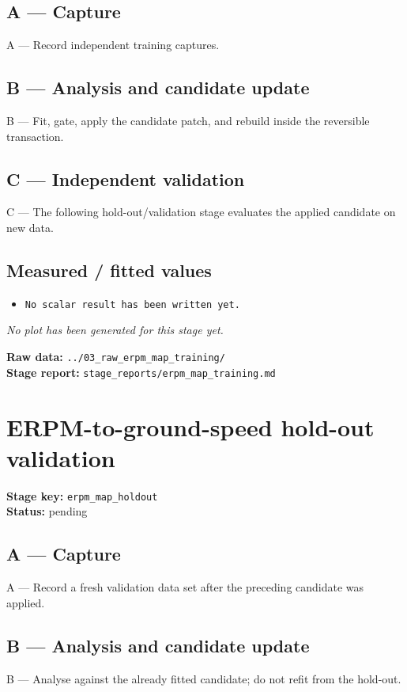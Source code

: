 \documentclass[11pt,a4paper]{article}
\begin{document}
\subsection*{A --- Capture}
A — Record independent training captures.

\subsection*{B --- Analysis and candidate update}
B — Fit, gate, apply the candidate patch, and rebuild inside the reversible transaction.

\subsection*{C --- Independent validation}
C — The following hold-out/validation stage evaluates the applied candidate on new data.

\subsection*{Measured / fitted values}
\begin{itemize}\setlength\itemsep{0pt}
\item \texttt{No scalar result has been written yet.}
\end{itemize}

\textit{No plot has been generated for this stage yet.}

\vfill
\textbf{Raw data:} \texttt{../03\_raw\_erpm\_map\_training/}\\
\textbf{Stage report:} \texttt{stage\_reports/erpm\_map\_training.md}
\clearpage
\small
\section*{ERPM-to-ground-speed hold-out validation}
\textbf{Stage key:} \texttt{erpm\_map\_holdout}\\
\textbf{Status:} pending\\

\subsection*{A --- Capture}
A — Record a fresh validation data set after the preceding candidate was applied.

\subsection*{B --- Analysis and candidate update}
B — Analyse against the already fitted candidate; do not refit from the hold-out.
\end{document}

